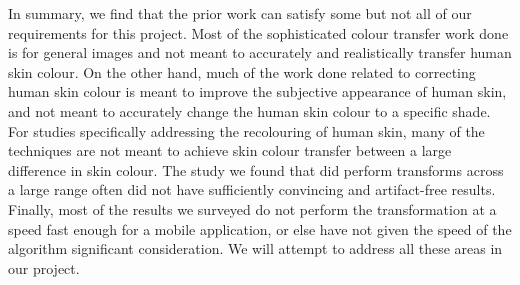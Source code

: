 In summary, we find that the prior work can satisfy some but not all of our requirements for this project. Most of the sophisticated colour transfer work done is for general images and not meant to accurately and realistically transfer human skin colour. On the other hand, much of the work done related to correcting human skin colour is meant to improve the subjective appearance of human skin, and not meant to accurately change the human skin colour to a specific shade. For studies specifically addressing the recolouring of human skin, many of the techniques are not meant to achieve skin colour transfer between a large difference in skin colour. The study we found that did perform transforms across a large range often did not have sufficiently convincing and artifact-free results. Finally, most of the results we surveyed do not perform the transformation at a speed fast enough for a mobile application, or else have not given the speed of the algorithm significant consideration. We will attempt to address all these areas in our project.
